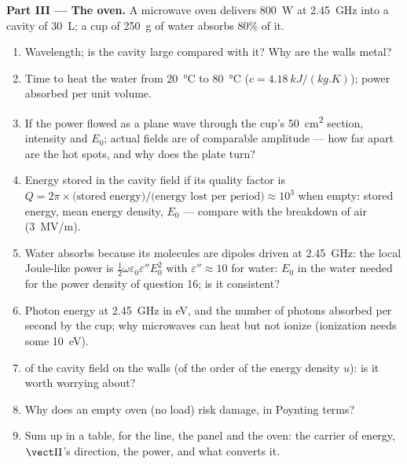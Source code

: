 \begin{problem}
\medskip
\noindent\textbf{Part III --- The oven.}
A microwave oven delivers \qty{800}{W} at \qty{2.45}{GHz} into a cavity of
\qty{30}{L}; a cup of \qty{250}{g} of water absorbs $80\%$ of it.
\begin{enumerate}[resume]
  \item Wavelength; is the cavity large compared with it? Why are the
        walls metal?
  \item Time to heat the water from \qty{20}{\degreeCelsius} to \qty{80}{\degreeCelsius}
        ($c = \qty{4.18}{kJ/(kg.K)}$); power absorbed per unit volume.
  \item If the power flowed as a plane wave through the cup's
        \qty{50}{cm^2} section, intensity and $E_0$; actual fields are
         of comparable amplitude --- how far apart are
        the hot spots, and why does the plate turn?
  \item Energy stored in the cavity field if its quality factor is
        $Q = 2\pi\times\text{(stored energy)}/\text{(energy lost per period)}
        \approx 10^3$ when empty: stored energy, mean energy density, $E_0$
        --- compare with the breakdown of air (\qty{3}{MV/m}).
  \item Water absorbs because its molecules are dipoles driven at
        \qty{2.45}{GHz}: the local Joule-like power is $\tfrac12\omega\varepsilon_0
        \varepsilon''E_0^2$ with $\varepsilon'' \approx 10$ for water: $E_0$ in the water
        needed for the power density of question 16; is it consistent?
  \item Photon energy at \qty{2.45}{GHz} in eV, and the number of photons
        absorbed per second by the cup; why microwaves can heat but
        not ionize (ionization needs some \qty{10}{eV}).
  \item {} of the cavity field on the walls (of the
        order of the energy density $u$): is it worth worrying about?
  \item Why does an empty oven (no load) risk damage, in Poynting
        terms?
  \item Sum up in a table, for the line, the panel and the oven: the
        carrier of energy, $\vect\Pi$'s direction, the power, and what
        converts it.
\end{enumerate}
\end{problem}
